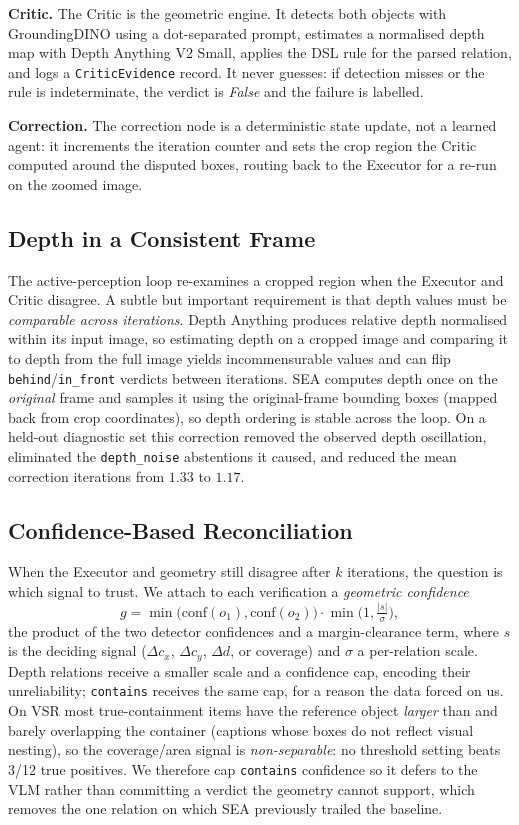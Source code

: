 \documentclass[10pt,twocolumn,letterpaper]{article}
\newcommand{\rel}[1]{\texttt{#1}}
\begin{document}
\textbf{Critic.} The Critic is the geometric engine. It detects both objects
with GroundingDINO using a dot-separated prompt, estimates a normalised depth
map with Depth Anything V2 Small, applies the DSL rule for the parsed
relation, and logs a \texttt{CriticEvidence} record. It never guesses: if
detection misses or the rule is indeterminate, the verdict is \emph{False} and
the failure is labelled.

\textbf{Correction.} The correction node is a deterministic state update, not
a learned agent: it increments the iteration counter and sets the crop region
the Critic computed around the disputed boxes, routing back to the Executor for
a re-run on the zoomed image.

\subsection{Depth in a Consistent Frame}
The active-perception loop re-examines a cropped region when the Executor and
Critic disagree. A subtle but important requirement is that depth values must
be \emph{comparable across iterations}. Depth Anything produces relative depth
normalised within its input image, so estimating depth on a cropped image and
comparing it to depth from the full image yields incommensurable values and
can flip \rel{behind}/\rel{in\_front} verdicts between iterations. SEA computes
depth once on the \emph{original} frame and samples it using the
original-frame bounding boxes (mapped back from crop coordinates), so depth
ordering is stable across the loop. On a held-out diagnostic set this
correction removed the observed depth oscillation, eliminated the
\texttt{depth\_noise} abstentions it caused, and reduced the mean correction
iterations from $1.33$ to $1.17$.

\subsection{Confidence-Based Reconciliation}
\label{sec:recon}
When the Executor and geometry still disagree after $k$ iterations, the
question is which signal to trust. We attach to each verification a
\emph{geometric confidence}
\begin{equation}
g = \min\!\big(\text{conf}(o_1),\text{conf}(o_2)\big)\cdot
\min\!\Big(1,\tfrac{|s|}{\sigma}\Big),
\end{equation}
the product of the two detector confidences and a margin-clearance term, where
$s$ is the deciding signal ($\Delta c_x$, $\Delta c_y$, $\Delta d$, or
coverage) and $\sigma$ a per-relation scale. Depth relations receive a smaller
scale and a confidence cap, encoding their unreliability; \rel{contains}
receives the same cap, for a reason the data forced on us. On VSR most
true-containment items have the reference object \emph{larger} than and barely
overlapping the container (captions whose boxes do not reflect visual nesting),
so the coverage/area signal is \emph{non-separable}: no threshold setting beats
3/12 true positives. We therefore cap \rel{contains} confidence so it defers to
the VLM rather than committing a verdict the geometry cannot support, which
removes the one relation on which SEA previously trailed the baseline.
\end{document}
